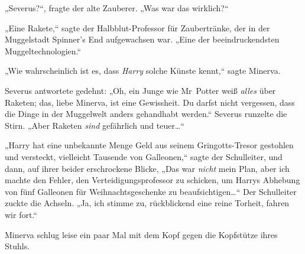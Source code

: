 „Severus?“, fragte der alte Zauberer. „Was war das wirklich?“

„Eine Rakete,“ sagte der Halbblut-Professor für Zaubertränke, der in der Muggelstadt Spinner's End aufgewachsen war. „Eine der beeindruckendsten Muggeltechnologien.“

„Wie wahrscheinlich ist es, dass \emph{Harry} solche Künste kennt,“ sagte Minerva.

Severus antwortete gedehnt: „Oh, ein Junge wie Mr~Potter weiß \emph{alles} über Raketen; das, liebe Minerva, ist eine Gewissheit. Du darfst nicht vergessen, dass die Dinge in der Muggelwelt anders gehandhabt werden.“ Severus runzelte die Stirn. „Aber Raketen \emph{sind} gefährlich und teuer…“

„Harry hat eine unbekannte Menge Geld aus seinem Gringotts-Tresor gestohlen und versteckt, vielleicht Tausende von Galleonen,“ sagte der Schulleiter, und dann, auf ihrer beider erschrockene Blicke, „Das war \emph{nicht} mein Plan, aber ich machte den Fehler, den Verteidigungsprofessor zu schicken, um Harrys Abhebung von fünf Galleonen für Weihnachtsgeschenke zu beaufsichtigen…“ Der Schulleiter zuckte die Achseln. „Ja, ich stimme zu, rückblickend eine reine Torheit, fahren wir fort.“

Minerva schlug leise ein paar Mal mit dem Kopf gegen die Kopfstütze ihres Stuhls.

